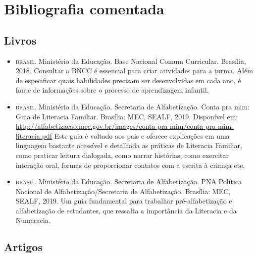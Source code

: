 \documentclass[11pt]{extarticle}
\begin{document}
\section{Bibliografia comentada}

\subsection{Livros}
\begin{itemize}
\item \textsc{brasil}. Ministério da Educação. Base Nacional Comum Curricular. Brasília, 2018.
Consultar a BNCC é essencial para criar atividades para a turma. Além de especificar 
quais habilidades precisam ser desenvolvidas em cada ano, é fonte de informações sobre 
o processo de aprendizagem infantil. 

\item \textsc{brasil}. Ministério da Educação. Secretaria de Alfabetização. Conta pra mim: Guia de Literacia Familiar. 
Brasília: MEC, SEALF, 2019. Disponível em: \url{http://alfabetizacao.mec.gov.br/images/conta-pra-mim/conta-pra-mim-literacia.pdf}
Este guia é voltado aos pais e oferece explicações em uma linguagem bastante acessível e detalhada as práticas de Literacia Familiar, 
como praticar leitura dialogada, como narrar histórias, como exercitar interação oral, formas de proporcionar contatos com a escrita à criança etc. 
 
\item \textsc{brasil}. Ministério da Educação. Secretaria de Alfabetização. PNA Política Nacional de Alfabetização/Secretaria 
de Alfabetização. Brasília: MEC, SEALF, 2019.
Um guia fundamental para trabalhar pré-alfabetização e alfabetização de estudantes, que ressalta a importância da Literacia e da Numeracia. 


\end{itemize}

\subsection{Artigos}
\end{document}
